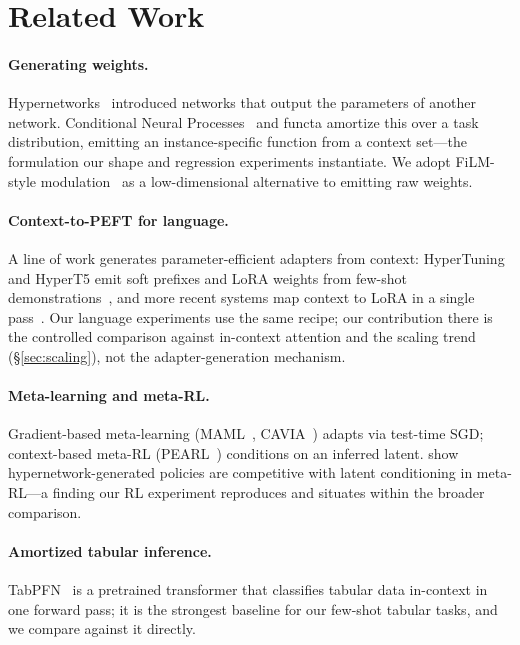 \documentclass[11pt]{article}
\begin{document}
\section{Related Work}

\paragraph{Generating weights.} Hypernetworks~\citep{ha2016hypernetworks} introduced
networks that output the parameters of another network. Conditional Neural
Processes~\citep{garnelo2018cnp} and functa amortize this over a task distribution,
emitting an instance-specific function from a context set---the formulation our
shape and regression experiments instantiate. We adopt FiLM-style
modulation~\citep{perez2018film} as a low-dimensional alternative to emitting raw
weights.

\paragraph{Context-to-PEFT for language.} A line of work generates
parameter-efficient adapters from context: HyperTuning and HyperT5 emit soft
prefixes and LoRA weights from few-shot
demonstrations~\citep{phang2023hypertuning,phang2024gisting}, and more recent systems
map context to LoRA in a single pass~\citep{shine2026,hyperlora2024}. Our language
experiments use the same recipe; our contribution there is the controlled comparison
against in-context attention and the scaling trend (\S\ref{sec:scaling}), not the
adapter-generation mechanism.

\paragraph{Meta-learning and meta-RL.} Gradient-based meta-learning
(MAML~\citep{finn2017maml}, CAVIA~\citep{zintgraf2019cavia}) adapts via test-time
SGD; context-based meta-RL (PEARL~\citep{rakelly2019pearl}) conditions on an inferred
latent. \citet{beck2023hypernetworks} show hypernetwork-generated policies are
competitive with latent conditioning in meta-RL---a finding our RL experiment
reproduces and situates within the broader comparison.

\paragraph{Amortized tabular inference.} TabPFN~\citep{hollmann2023tabpfn} is a
pretrained transformer that classifies tabular data in-context in one forward pass;
it is the strongest baseline for our few-shot tabular tasks, and we compare against
it directly.
\end{document}
